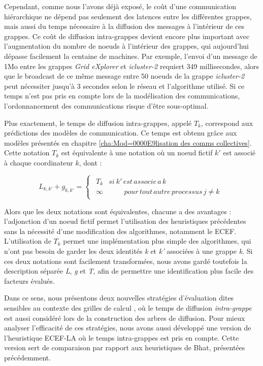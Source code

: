 Cependant, comme nous l'avons déjà exposé, le coût d'une communication
hiérarchique ne dépend pas seulement des latences entre les différentes
grappes, mais aussi du temps nécessaire à la diffusion des messages
à l'intérieur de ces grappes. Ce coût de diffusion intra-grappes devient
encore plus important avec l'augmentation du nombre de noeuds à l'intérieur
des grappes, qui aujourd'hui dépasse facilement la centaine de machines.
Par exemple, l'envoi d'un message de 1Mo entre les grappes \emph{Grid
	eXplorer} et \emph{icluster-2} requiert 349 millisecondes, alors que
le broadcast de ce même message entre 50 noeuds de la grappe \emph{icluster-2}
peut nécessiter jusqu'à 3 secondes selon le réseau et l'algorithme
utilisé. Si ce temps n'est pas pris en compte lors de la modélisation
des communications, l'ordonnancement des communications risque d'être
sous-optimal.

Plus exactement, le temps de diffusion intra-grappes, appelé $T_{k}$,
correspond aux prédictions des modèles de communication. Ce temps
est obtenu grâce aux modèles présentés en chapitre \ref{cha:Mod=0000E9lisation des comms collectives}.
Cette notation $T_{k}$ est équivalente à une notation où un noeud
fictif $k'$ est associé à chaque coordinateur $k$, dont :

\[
L_{k,k'}+g_{k,k'}=\left\{ \begin{array}{c}
\begin{array}{cc}
T_{k} & si\: k'\, est\, associe\, a\, k\\
\infty & \,\,\,\,\,\,\,\,\,\,\,\,\, pour\, tout\, autre\, processus\, j\neq k\end{array}\end{array}\right.\]


Alors que les deux notations sont équivalentes, chacune a des avantages
: l'adjonction d'un noeud fictif permet l'utilisation des heuristiques
précédentes sans la nécessité d'une modification des algorithmes,
notamment le ECEF. L'utilisation de $T_{k}$ permet une implémentation
plus simple des algorithmes, qui n'ont pas besoin de garder les deux
identités \emph{k} et \emph{k'} associées à une grappe \emph{k}. Si
ces deux notations sont facilement transformées, nous avons gardé
toutefois la description séparée \emph{L}, \emph{g} et \emph{T}, afin
de permettre une identification plus facile des facteurs évalués.

Dans ce sens, nous présentons deux nouvelles stratégies d'évaluation
dites \og sensibles au contexte des grilles de calcul \fg{}, où
le temps de diffusion \emph{intra-grappe} est aussi considéré lors
de la construction des arbres de diffusion. Pour mieux analyser l'efficacité
de ces stratégies, nous avons aussi développé une version de l'heuristique
ECEF-LA où le temps intra-grappes est pris en compte. Cette version
sert de comparaison par rapport aux heuristiques de Bhat, présentées
précédemment. 


